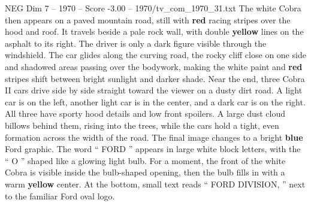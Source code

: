 \begin{textsample}{NEG Dim 7 – 1970 – Score -3.00 – 1970/tv\_com\_1970\_31.txt}
The white Cobra then appears on a paved mountain road, still with \textbf{red} racing stripes over the hood and roof.
It travels beside a pale rock wall, with double \textbf{yellow} lines on the asphalt to its right.
The driver is only a dark figure visible through the windshield.
The car glides along the curving road, the rocky cliff close on one side and shadowed areas passing over the bodywork, making the white paint and \textbf{red} stripes shift between bright sunlight and darker shade.
Near the end, three Cobra II cars drive side by side straight toward the viewer on a dusty dirt road.
A light car is on the left, another light car is in the center, and a dark car is on the right.
All three have sporty hood details and low front spoilers.
A large dust cloud billows behind them, rising into the trees, while the cars hold a tight, even formation across the width of the road.
The final image changes to a bright \textbf{blue} Ford graphic.
The word “ FORD ” appears in large white block letters, with the “ O ” shaped like a glowing light bulb.
For a moment, the front of the white Cobra is visible inside the bulb-shaped opening, then the bulb fills in with a warm \textbf{yellow} center.
At the bottom, small text reads “ FORD DIVISION, ” next to the familiar Ford oval logo.

\end{textsample}
